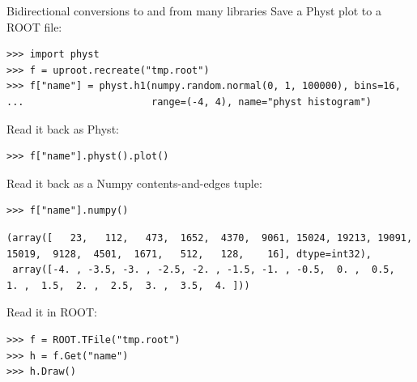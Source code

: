 \documentclass[aspectratio=169]{beamer}
\begin{document}
\begin{frame}[fragile]{Bidirectional conversions to and from many libraries}
\vspace{0.1 cm}
\normalsize
Save a Physt plot to a ROOT file:

\small
\begin{verbatim}
>>> import physt
>>> f = uproot.recreate("tmp.root")
>>> f["name"] = physt.h1(numpy.random.normal(0, 1, 100000), bins=16,
...                      range=(-4, 4), name="physt histogram")
\end{verbatim}

\normalsize
Read it back as Physt:

\small
\begin{verbatim}
>>> f["name"].physt().plot()
\end{verbatim}

\normalsize
Read it back as a Numpy contents-and-edges tuple:

\small
\begin{verbatim}
>>> f["name"].numpy()
\end{verbatim}

\tiny
\begin{verbatim}
(array([   23,   112,   473,  1652,  4370,  9061, 15024, 19213, 19091, 15019,  9128,  4501,  1671,   512,   128,    16], dtype=int32),
 array([-4. , -3.5, -3. , -2.5, -2. , -1.5, -1. , -0.5,  0. ,  0.5,  1. ,  1.5,  2. ,  2.5,  3. ,  3.5,  4. ]))
\end{verbatim}

\normalsize
Read it in ROOT:

\small
\begin{verbatim}
>>> f = ROOT.TFile("tmp.root")
>>> h = f.Get("name")
>>> h.Draw()
\end{verbatim}
\end{frame}
\end{document}
